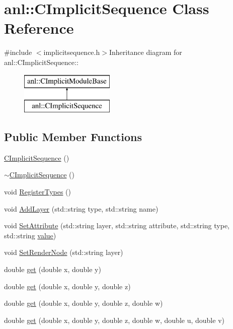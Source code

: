 \hypertarget{classanl_1_1CImplicitSequence}{
\section{anl::CImplicitSequence Class Reference}
\label{classanl_1_1CImplicitSequence}
}


{\ttfamily \#include $<$implicitsequence.h$>$}Inheritance diagram for anl::CImplicitSequence::\begin{figure}[H]
\begin{center}
\leavevmode
\includegraphics[height=2cm]{classanl_1_1CImplicitSequence}
\end{center}
\end{figure}
\subsection*{Public Member Functions}
\begin{DoxyCompactItemize}
\item 
\hyperlink{classanl_1_1CImplicitSequence_ac7c6662b9d0cdbeabcd77b417d5e8573}{CImplicitSequence} ()
\item 
\hyperlink{classanl_1_1CImplicitSequence_a79c6f6db15aacb1dcc8c766679573ffc}{$\sim$CImplicitSequence} ()
\item 
void \hyperlink{classanl_1_1CImplicitSequence_af55b873d0a6a38d8b1ea064ab349cfde}{RegisterTypes} ()
\item 
void \hyperlink{classanl_1_1CImplicitSequence_a79cf08cdd1a0056a6640c97680042068}{AddLayer} (std::string type, std::string name)
\item 
void \hyperlink{classanl_1_1CImplicitSequence_a5200549112cf8891fbad9e9459c6ce0c}{SetAttribute} (std::string layer, std::string attribute, std::string type, std::string \hyperlink{classanl_1_1CImplicitSequence_a82194754c6382be31fe9130ae018115e}{value})
\item 
void \hyperlink{classanl_1_1CImplicitSequence_a29cce3aaba4c9a353ce5d89919804a58}{SetRenderNode} (std::string layer)
\item 
double \hyperlink{classanl_1_1CImplicitSequence_a332ee86290e47c570c30fa858b262a9c}{get} (double x, double y)
\item 
double \hyperlink{classanl_1_1CImplicitSequence_a9514300a86679a099eccee6b87bfd9c1}{get} (double x, double y, double z)
\item 
double \hyperlink{classanl_1_1CImplicitSequence_a1db8e15397e9bf75176b5f24d57befac}{get} (double x, double y, double z, double w)
\item 
double \hyperlink{classanl_1_1CImplicitSequence_ad4333da8f7c124beb652a2de7b637753}{get} (double x, double y, double z, double w, double u, double v)
\end{DoxyCompactItemize}
